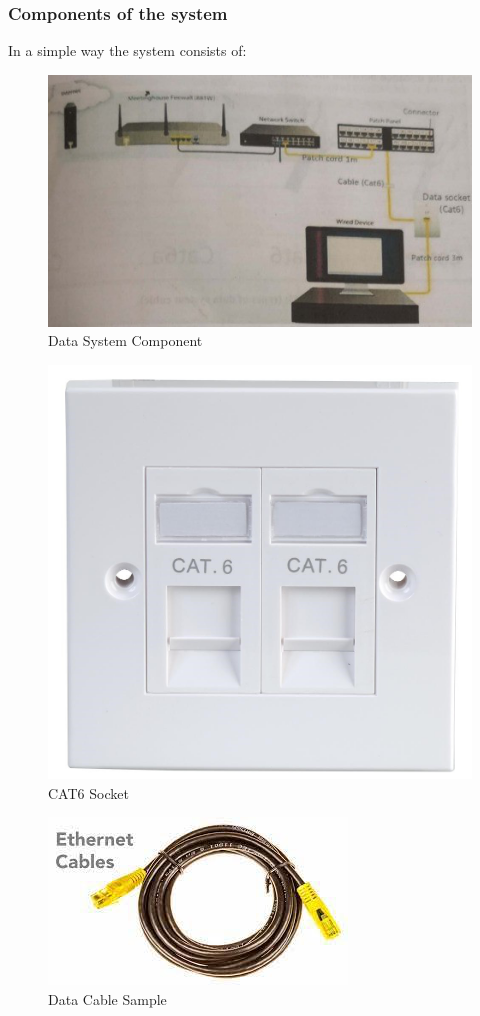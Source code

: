 \documentclass[12pt,fleqn]{book} %
\begin{document}
\subsubsection{Components of the system}
In a simple way the system consists of:
\begin{figure}[!h]
    \centering
    \includegraphics[width=0.5\linewidth]{hamdy 54.png}
    \caption{Data System Component}
    \label{fig:hamdy 54}
    \end{figure}
    \begin{figure}[!h]
    \centering
    \includegraphics[width=0.5\linewidth]{hamdy 55.png}
    \caption{CAT6 Socket}
    \label{fig:hamdy 55}
    \end{figure}
    \begin{figure}[!h]
    \centering
    \includegraphics[width=0.5\linewidth]{hamdy 56.png}
    \caption{Data Cable Sample}
    \label{fig:hamdy 56}
    \end{figure}
\end{document}

